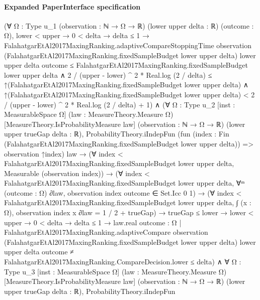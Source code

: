 \documentclass[10pt]{article}
\begin{document}
\paragraph{Expanded PaperInterface specification}
\begin{ReviewVerbatim}
(∀ {Ω : Type u_1} (observation : ℕ → Ω → ℝ) (lower upper delta : ℝ) (outcome : Ω),
    lower < upper →
      0 < delta →
        delta ≤ 1 →
          FalahatgarEtAl2017MaxingRanking.adaptiveCompareStoppingTime observation
                (FalahatgarEtAl2017MaxingRanking.fixedSampleBudget lower upper delta) lower upper delta outcome ≤
              FalahatgarEtAl2017MaxingRanking.fixedSampleBudget lower upper delta ∧
            2 / (upper - lower) ^ 2 * Real.log (2 / delta) ≤
                ↑(FalahatgarEtAl2017MaxingRanking.fixedSampleBudget lower upper delta) ∧
              ↑(FalahatgarEtAl2017MaxingRanking.fixedSampleBudget lower upper delta) <
                2 / (upper - lower) ^ 2 * Real.log (2 / delta) + 1) ∧
  (∀ {Ω : Type u_2} [inst : MeasurableSpace Ω] (law : MeasureTheory.Measure Ω) [MeasureTheory.IsProbabilityMeasure law]
      (observation : ℕ → Ω → ℝ) (lower upper trueGap delta : ℝ),
      ProbabilityTheory.iIndepFun
          (fun (index : Fin (FalahatgarEtAl2017MaxingRanking.fixedSampleBudget lower upper delta)) =>
            observation ↑index)
          law →
        (∀ index < FalahatgarEtAl2017MaxingRanking.fixedSampleBudget lower upper delta,
            Measurable (observation index)) →
          (∀ index < FalahatgarEtAl2017MaxingRanking.fixedSampleBudget lower upper delta,
              ∀ᵐ (outcome : Ω) ∂law, observation index outcome ∈ Set.Icc 0 1) →
            (∀ index < FalahatgarEtAl2017MaxingRanking.fixedSampleBudget lower upper delta,
                ∫ (x : Ω), observation index x ∂law = 1 / 2 + trueGap) →
              trueGap ≤ lower →
                lower < upper →
                  0 < delta →
                    delta ≤ 1 →
                      law.real
                          {outcome : Ω |
                            FalahatgarEtAl2017MaxingRanking.adaptiveCompare observation
                                (FalahatgarEtAl2017MaxingRanking.fixedSampleBudget lower upper delta) lower upper delta
                                outcome ≠
                              FalahatgarEtAl2017MaxingRanking.CompareDecision.lower} ≤
                        delta) ∧
    ∀ {Ω : Type u_3} [inst : MeasurableSpace Ω] (law : MeasureTheory.Measure Ω) [MeasureTheory.IsProbabilityMeasure law]
      (observation : ℕ → Ω → ℝ) (lower upper trueGap delta : ℝ),
      ProbabilityTheory.iIndepFun

\end{ReviewVerbatim}
\end{document}
